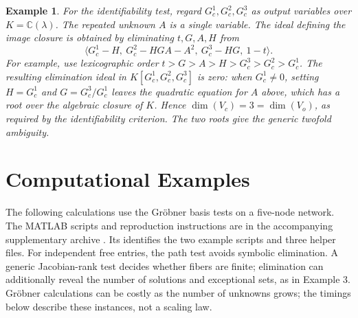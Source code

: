 \documentclass[journal,twoside,web]{ieeecolor}
\newtheorem{exmp}{Example}
\begin{document}
\begin{exmp}
For the identifiability test, regard $G_c^1,G_c^2,G_c^3$ as output
variables over $K=\mathbb C(\lambda)$. The repeated unknown $A$ is a single
variable. The ideal defining the image closure is obtained by eliminating
$t,G,A,H$ from
%
$$\langle G_c^1-H,\ G_c^2-HGA-A^2,\ G_c^3-HG,\ 1-t\rangle.$$
%
For example, use lexicographic order
$t>G>A>H>G_c^3>G_c^2>G_c^1$. The resulting elimination ideal in
$K[G_c^1,G_c^2,G_c^3]$ is zero: when $G_c^1\neq0$, setting
$H=G_c^1$ and $G=G_c^3/G_c^1$ leaves the quadratic equation for $A$
above, which has a root over the algebraic closure of $K$.
Hence $\dim(V_c)=3=\dim(V_o)$, as required by the identifiability
criterion. The two roots give the generic twofold ambiguity.
%
\end{exmp}
%
\section{Computational Examples}
%
The following calculations use the Gröbner basis tests on a five-node
network. The MATLAB scripts and reproduction instructions are in the
accompanying supplementary archive .
Its  identifies the two example scripts and three helper files.
For independent free entries, the path test avoids symbolic elimination.
A generic Jacobian-rank test decides whether fibers are finite; elimination
can additionally reveal the number of solutions and exceptional sets, as in
Example 3. Gröbner calculations can be costly as the number of unknowns
grows; the timings below describe these instances, not a scaling law.
%
\end{document}
